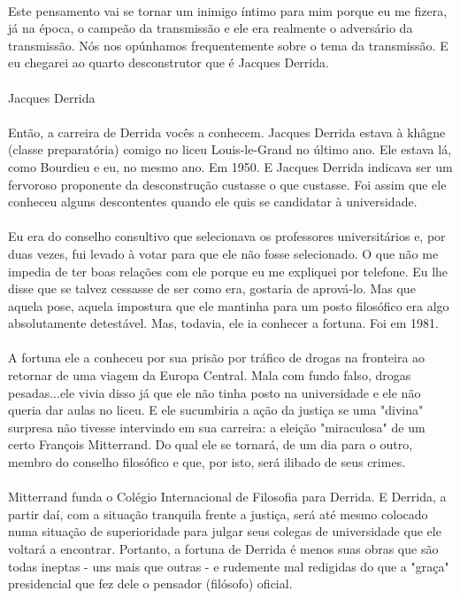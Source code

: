 \documentclass[10pt,a4paper]{book}
\begin{document}
	\\
	Este pensamento vai se tornar um inimigo íntimo para mim porque eu me fizera, já na época, o campeão da transmissão e ele era realmente o adversário da transmissão. Nós nos opúnhamos frequentemente sobre o tema da transmissão. E eu chegarei ao quarto desconstrutor que é Jacques Derrida.\\
	\\
	Jacques Derrida\\
	\\
	Então, a carreira de Derrida vocês a conhecem. Jacques Derrida estava à khâgne (classe preparatória) comigo no liceu Louis-le-Grand no último ano. Ele estava lá, como Bourdieu e eu, no mesmo ano. Em 1950. E Jacques Derrida indicava ser um fervoroso proponente da desconstrução custasse o que custasse. Foi assim que ele conheceu alguns descontentes quando ele quis se candidatar à universidade.\\
	\\
	Eu era do conselho consultivo que selecionava os professores universitários e, por duas vezes, fui levado à votar para que ele não fosse selecionado. O que não me impedia de ter boas relações com ele porque eu me expliquei por telefone. Eu lhe disse que se talvez cessasse de ser como era, gostaria de aprová-lo. Mas que aquela pose, aquela impostura que ele mantinha para um posto filosófico era algo absolutamente detestável. Mas, todavia, ele ia conhecer a fortuna. Foi em 1981.\\
	\\
	A fortuna ele a conheceu por sua prisão por tráfico de drogas na fronteira ao retornar de uma viagem da Europa Central. Mala com fundo falso, drogas pesadas...ele vivia disso já que ele não tinha posto na universidade e ele não queria dar aulas no liceu. E ele sucumbiria a ação da justiça se uma "divina" surpresa não tivesse intervindo em sua carreira: a eleição "miraculosa" de um certo François Mitterrand. Do qual ele se tornará, de um dia para o outro, membro do conselho filosófico e que, por isto, será ilibado de seus crimes.\\
	\\
	Mitterrand funda o Colégio Internacional de Filosofia para Derrida. E Derrida, a partir daí, com a situação tranquila frente a justiça, será até mesmo colocado numa situação de superioridade para julgar seus colegas de universidade que ele voltará a encontrar. Portanto, a fortuna de Derrida é menos suas obras que são todas ineptas - uns mais que outras - e rudemente mal redigidas do que a "graça" presidencial que fez dele o pensador (filósofo) oficial.\\
\end{document}
